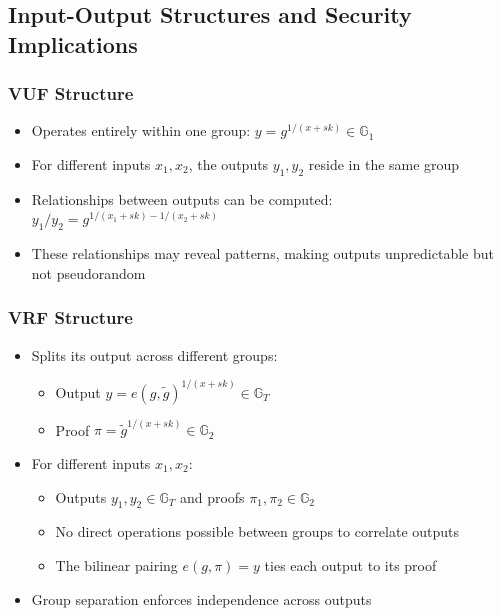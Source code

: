\subsection{Input-Output Structures and Security Implications}

\subsubsection{VUF Structure}
\begin{itemize}
    \item Operates entirely within one group: $y = g^{1/(x + sk)} \in \mathbb{G}_1$
    \item For different inputs $x_1, x_2$, the outputs $y_1, y_2$ reside in the same group
    \item Relationships between outputs can be computed: $y_1/y_2 = g^{1/(x_1 + sk) - 1/(x_2 + sk)}$
    \item These relationships may reveal patterns, making outputs unpredictable but not pseudorandom
\end{itemize}

\subsubsection{VRF Structure}
\begin{itemize}
    \item Splits its output across different groups:
    \begin{itemize}
        \item Output $y = e(g, \tilde{g})^{1/(x + sk)} \in \mathbb{G}_T$
        \item Proof $\pi = \tilde{g}^{1/(x + sk)} \in \mathbb{G}_2$
    \end{itemize}
    \item For different inputs $x_1, x_2$:
    \begin{itemize}
        \item Outputs $y_1, y_2 \in \mathbb{G}_T$ and proofs $\pi_1, \pi_2 \in \mathbb{G}_2$
        \item No direct operations possible between groups to correlate outputs
        \item The bilinear pairing $e(g, \pi) = y$ ties each output to its proof
    \end{itemize}
    \item Group separation enforces independence across outputs
\end{itemize}

